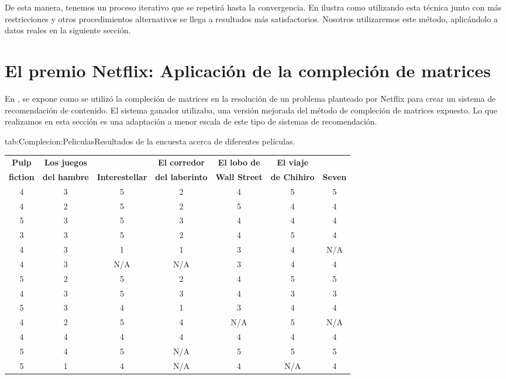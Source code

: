 \documentclass[tfg,cienciasbased,lot,lof,covers,final,overleaf,nocopyright]{tfgtfmthesisuam}
\begin{document}
De esta manera, tenemos un proceso iterativo que se repetirá hasta la convergencia. En \cite{Hastie} ilustra como utilizando esta técnica junto con más restricciones y otros procedimientos alternativos se llega a resultados más satisfactorios. Nosotros utilizaremos este método, aplicándolo a datos reales en la siguiente sección.

\section{El premio Netflix: Aplicación de la compleción de matrices}

En \cite{Hastie}, se expone como se utilizó la compleción de matrices en la resolución de un problema planteado por Netflix para crear un sistema de recomendación de contenido. El sistema ganador utilizaba, una versión mejorada del método de compleción de matrices expuesto. Lo que realizamos en esta sección es una adaptación a menor escala de este tipo de sistemas de recomendación.

\begin{table}{tab:Complecion:Peliculas}{Resultados de la encuesta acerca de diferentes películas.}
    \begin{tabular}{ccccccc}
        \toprule
        \textbf{Pulp} & \textbf{Los juegos} &  & \textbf{El corredor} & \textbf{El lobo de} & \textbf{El viaje} &\\
        \textbf{fiction} & \textbf{del hambre} & \textbf{Interestellar} & \textbf{del laberinto} & \textbf{Wall Street} & \textbf{de Chihiro} & \textbf{Seven}\\
        \midrule
        4 & 3 & 5 & 2 & 4 & 5 & 5\\
        4 & 2 & 5 & 2 & 5 & 4 & 4\\
        5 & 3 & 5 & 3 & 4 & 4 & 4\\
        3 & 3 & 5 & 2 & 4 & 5 & 4\\
        4 & 3 & 1 & 1 & 3 & 4 & N/A\\
        4 & 3 & N/A & N/A & 3 & 4 & 4\\
        5 & 2 & 5 & 2 & 4 & 5 & 5\\
        4 & 3 & 5 & 3 & 4 & 3 & 3\\
        5 & 3 & 4 & 1 & 3 & 4 & 4\\
        4 & 2 & 5 & 4 & N/A & 5 & N/A\\
        4 & 4 & 4 & 4 & 4 & 4 & 4\\
        5 & 4 & 5 & N/A & 5 & 5 & 5\\
        5 & 1 & 4 & N/A & 4 & N/A & 4\\
        \bottomrule
    \end{tabular}
\end{table}
\end{document}
